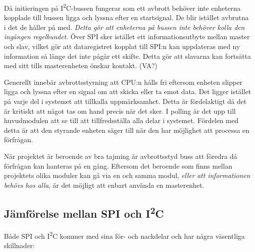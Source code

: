 \documentclass[11pt]{article}
\begin{document}
\begin{flushleft}



Då initieringen på I\textsuperscript{2}C-bussen fungerar som ett avbrott behöver inte enheterna kopplade till bussen ligga och lyssna efter en startsignal. De blir istället avbrutna i det de håller på med.\cite{guideI2C} \textit{Detta gör att enheterna på bussen inte behöver kolla den ingången regelbundet.} Över SPI sker istället ett informationsutbyte mellan master och slav, vilket gör att dataregistret kopplat till SPI:n kan uppdateras med ny information så länge det inte  pågår ett skifte. Detta gör att slavarna kan fortsätta med sitt tills masterenheten önskar kontakt. \cite{ATMega16}(VA?)

Generellt innebär avbrottsstyrning att CPU:n hålls fri eftersom enheten slipper ligga och lyssna efter en signal om att skicka eller ta emot data. Det ligger istället på varje del i systemet att tillkalla uppmärksamhet. Detta är fördelaktigt då det är kritiskt att något tas om hand precis när det sker. I polling är det upp till huvudmodulen att se till att tillfredsställa alla delar i systemet. Fördelen med detta är att den styrande enheten säger till när den har möjlighet att processa en förfrågan. \cite{interruptPoll}

När projektet är beroende av bra tajming är avbrottsstyd buss att föredra då förfrågan kan hanteras på en gång. Eftersom  det beroende som finns mellan projektets olika moduler kan gå via en och samma modul, \textit{eller att informationen behövs hos alla}, är det möjligt att enbart använda en masterenhet.

\subsection{Jämförelse mellan SPI och I\textsuperscript{2}C}
Både SPI och I\textsuperscript{2}C kommer med sina för- och nackdelar och har några väsentliga skillnader:


\end{flushleft}
\end{document}
